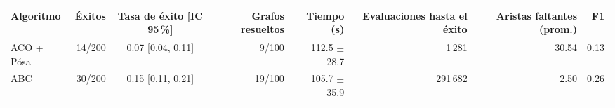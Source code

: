 \begin{tabular}{lrcrrrrr}
\toprule
Algoritmo & Éxitos & Tasa de éxito [IC 95\,\%] & Grafos resueltos & Tiempo (s) & Evaluaciones hasta el éxito & Aristas faltantes (prom.) & F1 \\
\midrule
ACO + Pósa & 14/200 & 0.07 [0.04, 0.11] & 9/100 & 112.5 $\pm$ 28.7 & 1\,281 & 30.54 & 0.13 \\
ABC & 30/200 & 0.15 [0.11, 0.21] & 19/100 & 105.7 $\pm$ 35.9 & 291\,682 & 2.50 & 0.26 \\
\bottomrule
\end{tabular}
